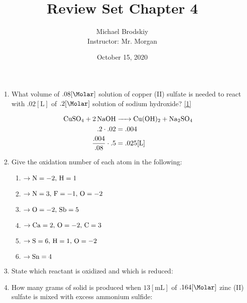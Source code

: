 \documentclass[12pt]{article}
\title{Review Set Chapter 4}
\date{October 15, 2020}
\author{Michael Brodskiy\\ \small Instructor: Mr. Morgan}
\begin{document}
\maketitle

\begin{enumerate}

  \item What volume of $.08[\si{\Molar}]$ solution of copper (II) sulfate is needed to react with $.02[\si{\liter}]$ of $.2[\si{\Molar}]$ solution of sodium hydroxide? \eqref{1}

    \begin{equation}
      \begin{split}
        \ce{CuSO4 + 2NaOH } & \ce{-> Cu(OH)2 + Na2SO4}\\
        .2\cdot.02 & = .004\\
        \frac{.004}{.08}\cdot .5 & = .025[\si{\liter}]
      \end{split}
      \label{1}
    \end{equation}

  \item Give the oxidation number of each atom in the following:

    \begin{enumerate}

      \item {} $\rightarrow \ce{N}=-2,\,\ce{H}=1$

      \item {} $\rightarrow \ce{N}=3,\,\ce{F}=-1,\,\ce{O}=-2$

      \item {} $\rightarrow \ce{O}=-2,\,\ce{Sb}=5$

      \item {} $\rightarrow \ce{Ca}=2,\,\ce{O}=-2,\,\ce{C}=3$

      \item {} $\rightarrow \ce{S}=6,\,\ce{H}=1,\,\ce{O}=-2$

      \item {} $\rightarrow \ce{Sn}=4$

    \end{enumerate}

  \item State which reactant is oxidized and which is reduced:

  \item How many grams of solid is produced when $13[\si{\milli\liter}]$ of $.164[\si{\Molar}]$ zinc (II) sulfate is mixed with excess ammonium sulfide:


\end{enumerate}
\end{document}

